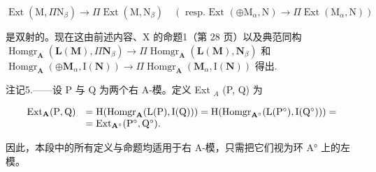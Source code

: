 \[
\operatorname{Ext} \left(\mathrm{M}, \Pi \mathrm{N} _ {\beta}\right)\rightarrow \Pi \operatorname{Ext} \left(\mathrm{M}, \mathrm{N} _ {\beta}\right) \quad (\text { resp.   Ext } (\oplus \mathrm{M} _ {\alpha}, \mathrm{N}) \rightarrow \Pi \operatorname{Ext} \left(\mathrm{M} _ {\alpha}, \mathrm{N}\right))
\]

是双射的。现在这由前述内容、X 的命题1（第 28 页）以及典范同构 \(\operatorname{Homgr}_{\mathbf{A}}(\mathbf{L}(\mathbf{M}), \Pi \mathbf{N}_{\beta}) \to \Pi \operatorname{Homgr}_{\mathbf{A}}(\mathbf{L}(\mathbf{M}), \mathbf{N}_{\beta})\) 和 \(\operatorname{Homgr}_{\mathbf{A}}(\oplus \mathbf{M}_{\alpha}, \mathrm{I}(\mathbf{N})) \to \Pi \operatorname{Homgr}_{\mathbf{A}}(\mathbf{M}_{\alpha}, \mathrm{I}(\mathbf{N}))\) 得出.

注记5.——设 P 与 Q 为两个右 A-模。定义 Ext \(_{A}\) (P, Q) 为

\[
\begin{array}{r l} \operatorname{Ext} _ {\mathbf {A}} (\mathrm{P}, \mathrm{Q}) & = \mathrm{H} (\operatorname{Homgr} _ {\mathbf {A}} (\mathrm{L} (\mathrm{P}), \mathrm{I} (\mathrm{Q}))) = \mathrm{H} (\operatorname{Homgr} _ {\mathbf {A} ^ {\circ}} (\mathrm{L} (\mathrm{P} ^ {\circ}), \mathrm{I} (\mathrm{Q} ^ {\circ}))) = \\ & = \operatorname{Ext} _ {\mathbf {A} ^ {\circ}} (\mathrm{P} ^ {\circ}, \mathrm{Q} ^ {\circ}). \end{array}
\]

因此，本段中的所有定义与命题均适用于右 A-模，只需把它们视为环 A° 上的左模。

